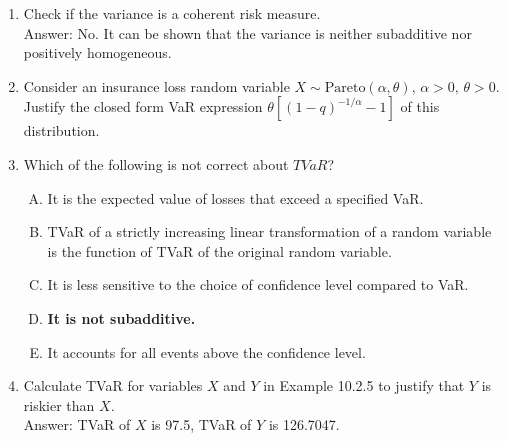 \documentclass[11pt,a4paper,onecolumn]{article}
\begin{document}
\begin{enumerate}

\item Check if the variance is a coherent risk measure. \\
Answer: No. It can be shown that the variance is neither subadditive nor positively homogeneous.

\item Consider an insurance loss random variable $X\sim \text{Pareto}(\alpha,\theta),\,\alpha>0,\,\theta>0$. Justify the closed form VaR expression $\theta[(1-q)^{-1/\alpha}-1]$ of this distribution.
\item Which of the following is not correct about $TVaR$?
\begin{enumerate}[A.]
	\item It is the expected value of losses that exceed a specified VaR.
	\item TVaR of a strictly increasing linear transformation of a random variable is the function of TVaR of the original random variable.
	\item It is less sensitive to the choice of confidence level compared to VaR.
	\item \textbf{It is not subadditive.}
	\item It accounts for all events above the confidence level.
\end{enumerate}
\item Calculate TVaR for variables $X$ and $Y$ in Example 10.2.5 to justify that $Y$ is riskier than $X$. \\
Answer: TVaR of $X$ is 97.5, TVaR of $Y$ is 126.7047.
\end{enumerate}
\end{document}
